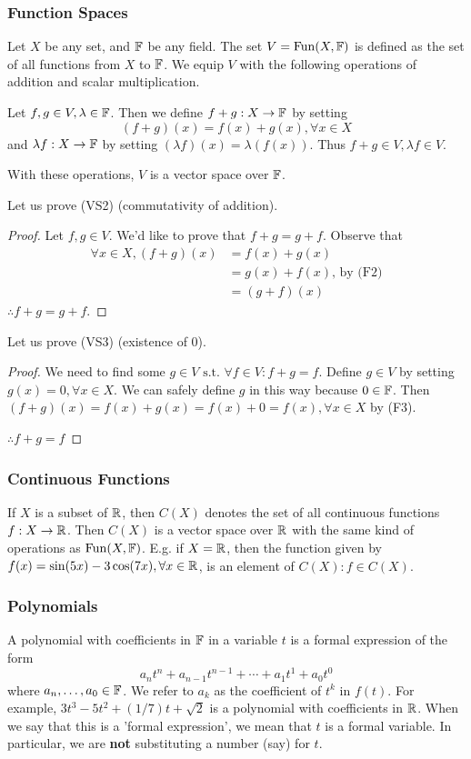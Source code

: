 \subsubsection{Function Spaces}
Let \(X\) be any set, and \(\mathbb{F}\) be any field. The set \(V = \operatorname{Fun}(X, \mathbb{F})\) is defined as the set of all functions from \(X\) to \(\mathbb{F}\). We equip \(V\) with the following operations of addition and scalar multiplication.

Let \(f,g\in V, \lambda \in \mathbb{F}\). 
Then we define \(f + g : X \to \mathbb{F}\) by setting
\[(f+g)(x)=f(x) + g(x), \forall x\in X\] 
and \(\lambda f : X \to \mathbb{F}\) by setting
\((\lambda f)(x) = \lambda(f(x))\). Thus \(f+g \in V, \lambda f \in V\).

With these operations, \(V\) is a vector space over \(\mathbb{F}\).

Let us prove (VS2) (commutativity of addition).
\begin{proof}
Let \(f,g\in V\). We'd like to prove that \(f+g=g+f\). Observe that 
\begin{align*}
	\forall x\in X, (f+g)(x) 	&= f(x)+g(x) \\
							 	&= g(x)+f(x)\text{, by (F2)} \\
							 	&= (g+f)(x)
\end{align*}
\(\therefore f+g=g+f\).
\end{proof}

Let us prove (VS3) (existence of 0).
\begin{proof}
We need to find some \(g\in V \text{ s.t. } \forall f\in V : f + g = f\).
Define \(g\in V\) by setting \(g(x)=0, \forall x \in X\). We can safely define \(g\) in this way because \(0\in\mathbb{F}\). Then \((f+g)(x)=f(x)+g(x)=f(x)+0=f(x), \forall x\in X\) by (F3).

\(\therefore f + g = f\)
\end{proof}

\subsubsection{Continuous Functions}
If \(X\) is a subset of \(\mathbb{R}\), then \(C(X)\) denotes the set of all continuous functions \(f:X\to\mathbb{R}\). Then \(C(X)\) is a vector space over \(\mathbb{R}\) with the same kind of operations as \(\operatorname{Fun}(X, \mathbb{F})\). E.g. if \(X=\mathbb{R}\), then the function given by \(f(x)=\sin(5x)-3\cos(7x), \forall x \in \mathbb{R}\), is an element of \(C(X) : f\in C(X)\).

\subsubsection{Polynomials}
A polynomial with coefficients in \(\mathbb{F}\) in a variable \(t\) is a formal expression of the form
\[a_n t^n + a_{n-1}t^{n-1} + \dotsb + a_1 t^1 + a_0 t^0\]
where \(a_n, \dotsc, a_0 \in \mathbb{F}\). We refer to \(a_k\) as the coefficient of \(t^k\) in \(f(t)\). For example, \(3t^3 - 5t^2 + (1/7)t + \sqrt{2}\) is a polynomial with coefficients in \(\mathbb{R}\). When we say that this is a 'formal expression', we mean that \(t\) is a formal variable. In particular, we are \textbf{not} substituting a number (say) for \(t\). 

